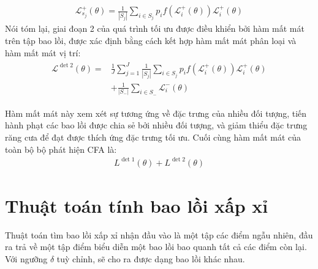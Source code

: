 \documentclass[12pt,a4paper,openany,oneside]{report}
\begin{document}
\begin{align}\label{loss_update}
	\mathcal{L}_{s_j}^{+}(\theta)=\frac{1}{\left|S_j\right|} \sum_{i \in S_j} p_i f\left(\mathcal{L}_i^{+}(\theta)\right) \mathcal{L}_i^{+}(\theta)
\end{align}
Nói tóm lại, giai đoạn 2 của quá trình tối ưu được điều khiển bởi hàm mất mát trên tập bao lồi, được xác định bằng cách kết hợp hàm mất mát phân loại và hàm mất mát vị trí:
\begin{align} \label{loss_det_2}
	\begin{aligned}
		\mathcal{L}^{\operatorname{det} 2}(\theta)= & \frac{1}{J} \sum_{j=1}^J \frac{1}{\left|S_j\right|} \sum_{i \in S_j} p_i f\left(\mathcal{L}_i^{+}(\theta)\right) \mathcal{L}_i^{+}(\theta) \\
		& +\frac{1}{\left|S_{-}\right|} \sum_{i \in S_{-}} \mathcal{L}_i^{-}(\theta)
	\end{aligned}
\end{align}

Hàm mất mát này xem xét sự tương ứng về đặc trưng của nhiều đối tượng, tiến hành phạt các bao lồi được chia sẻ bởi nhiều đối tượng, và giảm thiểu đặc trưng răng cưa để đạt được thích ứng đặc trưng tối ưu. Cuối cùng hàm mất mát của toàn bộ bộ phát hiện CFA là: 
\begin{align} \label{final_loss_CFA}
	L^{\operatorname{det} 1}(\theta)+L^{\operatorname{det} 2}(\theta)
\end{align}

\chapter{Thuật toán tính bao lồi xấp xỉ}
Thuật toán tìm bao lồi xấp xỉ nhận đầu vào là một tập các điểm ngẫu nhiên, đầu ra trả về một tập điểm biểu diễn một bao lồi bao quanh tất cả các điểm còn lại. Với ngưỡng $\delta$ tuỳ chỉnh, sẽ cho ra được dạng bao lồi khác nhau.
\end{document}
